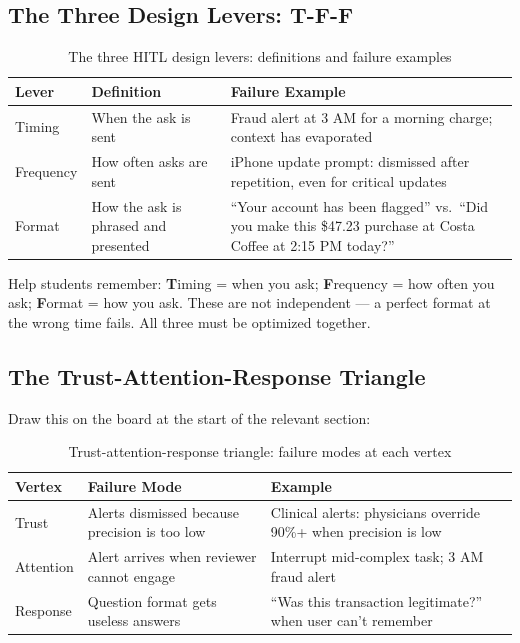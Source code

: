 \subsection{The Three Design Levers: T-F-F}

\begin{table}[htbp]
\caption{The three HITL design levers: definitions and failure examples}
\label{tab:tff-ch05}
\centering
\begin{tabular}{@{}p{2cm}p{4.5cm}p{4.5cm}@{}}
\toprule
\textbf{Lever} & \textbf{Definition} & \textbf{Failure Example} \\
\midrule
Timing & When the ask is sent & Fraud alert at 3 AM for a morning charge; context has evaporated \\
Frequency & How often asks are sent & iPhone update prompt: dismissed after repetition, even for critical updates \\
Format & How the ask is phrased and presented & ``Your account has been flagged'' vs.\ ``Did you make this \$47.23 purchase at Costa Coffee at 2:15 PM today?'' \\
\bottomrule
\end{tabular}
\end{table}

\begin{keyconcept}[Mnemonic: T-F-F]
Help students remember: \textbf{T}iming = when you ask; \textbf{F}requency = how often you ask; \textbf{F}ormat = how you ask. These are not independent --- a perfect format at the wrong time fails. All three must be optimized together.
\end{keyconcept}

\subsection{The Trust-Attention-Response Triangle}

Draw this on the board at the start of the relevant section:

\begin{table}[htbp]
\caption{Trust-attention-response triangle: failure modes at each vertex}
\label{tab:triangle-ch05}
\centering
\begin{tabular}{@{}p{2.5cm}p{4.5cm}p{4cm}@{}}
\toprule
\textbf{Vertex} & \textbf{Failure Mode} & \textbf{Example} \\
\midrule
Trust & Alerts dismissed because precision is too low & Clinical alerts: physicians override 90\%+ when precision is low \\
Attention & Alert arrives when reviewer cannot engage & Interrupt mid-complex task; 3 AM fraud alert \\
Response & Question format gets useless answers & ``Was this transaction legitimate?'' when user can't remember \\
\bottomrule
\end{tabular}
\end{table}

